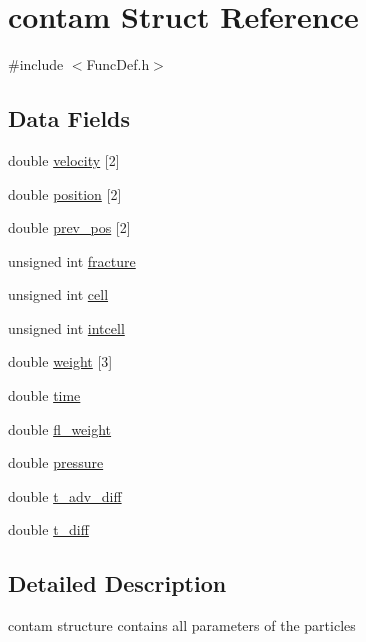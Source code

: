 \hypertarget{structcontam}{}\section{contam Struct Reference}
\label{structcontam}


{\ttfamily \#include $<$Func\+Def.\+h$>$}

\subsection*{Data Fields}
\begin{DoxyCompactItemize}
\item 
double \mbox{\hyperlink{structcontam_a70e44829116675e21bda7422f0c2b777}{velocity}} \mbox{[}2\mbox{]}
\item 
double \mbox{\hyperlink{structcontam_afdb17185baff7dc4f22cd6c76c6fd6fd}{position}} \mbox{[}2\mbox{]}
\item 
double \mbox{\hyperlink{structcontam_aacd8d2e19b4a3c689e96cf9693218777}{prev\+\_\+pos}} \mbox{[}2\mbox{]}
\item 
unsigned int \mbox{\hyperlink{structcontam_a0b9253ce268d781958145f9d110df2de}{fracture}}
\item 
unsigned int \mbox{\hyperlink{structcontam_a858c05f3221a70f6e212c1e7e172252c}{cell}}
\item 
unsigned int \mbox{\hyperlink{structcontam_a1747a7b7a63f22656afa1df6462279e8}{intcell}}
\item 
double \mbox{\hyperlink{structcontam_a5b317ab55ab5b48dc82c9a473c76a41e}{weight}} \mbox{[}3\mbox{]}
\item 
double \mbox{\hyperlink{structcontam_a11c5e87e6e62d258648d5a02472251d5}{time}}
\item 
double \mbox{\hyperlink{structcontam_ad50f20b01e37af1fedfd7bbe0cd1d7e3}{fl\+\_\+weight}}
\item 
double \mbox{\hyperlink{structcontam_a185c332f0d90695ee85c1e243085e2ba}{pressure}}
\item 
double \mbox{\hyperlink{structcontam_aaa72e564c7052e029003076e0d8768be}{t\+\_\+adv\+\_\+diff}}
\item 
double \mbox{\hyperlink{structcontam_aaff43bc31b910d7ac48f5d0a78f2212b}{t\+\_\+diff}}
\end{DoxyCompactItemize}


\subsection{Detailed Description}
contam structure contains all parameters of the particles 

